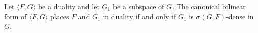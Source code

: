 Let $\langle F, G \rangle$ be a duality and let $G_1$ be a subspace of $G$. The canonical bilinear form of $\langle F, G \rangle$ places $F$ and $G_1$ in duality if and only if $G_1$ is $\sigma(G, F)$-dense in $G$.
